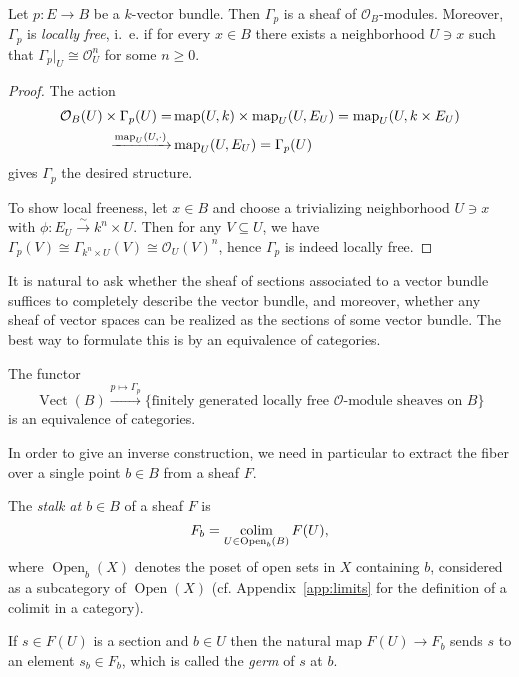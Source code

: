 \documentclass[a4paper,openany]{scrbook}
\DeclareMathOperator{\Vect}{Vect}
\DeclareMathOperator{\Open}{Open}
\begin{document}
\begin{prop}
Let $p\colon E \to B$ be a $k$-vector bundle. Then $\Gamma_p$ is a sheaf of $\mathcal O_B$-modules. Moreover, $\Gamma_p$ is \emph{locally free}, i.~e. if for every $x \in B$ there exists a neighborhood $U \ni x$ such that $\Gamma_p|_U \cong \mathcal O_U^n$ for some $n \geq 0$.
\end{prop}
\begin{proof}
The action
\begin{align*}
\mathcal O_B(U) \times \Gamma_p(U) =& \operatorname{map}(U,k) \times \operatorname{map}_U(U,E_U) = \operatorname{map}_U(U,k\times E_U)\\
\xrightarrow{\operatorname{map}_U(U,\cdot)} &\operatorname{map}_U(U,E_U) = \Gamma_p(U)
\end{align*}
gives $\Gamma_p$ the desired structure.

To show local freeness, let $x \in B$ and choose a trivializing neighborhood $U \ni x$ with $\phi\colon E_U \xrightarrow{\sim} k^n \times U$. Then for any $V \subseteq U$, we have $\Gamma_p(V) \cong \Gamma_{k^n \times U}(V) \cong \mathcal O_U(V)^n$, hence $\Gamma_p$ is indeed locally free.
\end{proof}

It is natural to ask whether the sheaf of sections associated to a vector bundle suffices to completely describe the vector bundle, and moreover, whether any sheaf of vector spaces can be realized as the sections of some vector bundle. The best way to formulate this is by an equivalence of categories.

\begin{thm}\label{thm:vbsheafequivalence}
The functor
\[
\Vect(B) \xrightarrow{p \mapsto \Gamma_p} \{\text{finitely generated locally free $\mathcal O$-module sheaves on $B$}\}
\]
is an equivalence of categories.
\end{thm}

In order to give an inverse construction, we need in particular to extract the fiber over a single point $b \in B$ from a sheaf $F$.

\begin{defn}
The \emph{stalk at $b \in B$} of a sheaf $F$ is
\[
F_b = \colim_{U \in \Open_b(B)} F(U),
\]
where $\Open_b(X)$ denotes the poset of open sets in $X$ containing $b$, considered as a subcategory of $\Open(X)$ (cf. Appendix~\ref{app:limits} for the definition of a colimit in a category).

If $s \in F(U)$ is a section and $b \in U$ then the natural map $F(U) \to F_b$ sends $s$ to an element $s_b \in F_b$, which is called the \emph{germ} of $s$ at $b$.
\end{defn}
\end{document}
